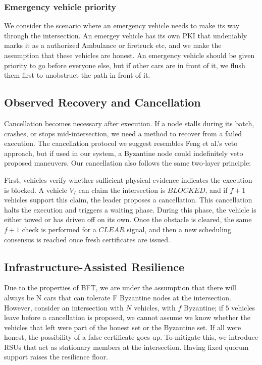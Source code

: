\documentclass[letterpaper,10pt,conference]{IEEEtran}
\begin{document}
\subsubsection{Emergency vehicle priority}

We consider the scenario where an emergency vehicle needs to make its way through the intersection. An emergey vehicle has its own PKI that undeniably marks it as a authorized Ambulance or firetruck etc, and we make the assumption that these vehicles are honest. An emergency vehicle should be given priority to go before everyone else, but if other cars are in front of it, we flush them first to unobstruct the path in front of it.


\subsection{Observed Recovery and Cancellation}
\label{sec:recovery}

Cancellation becomes necessary after execution. If a node stalls during its batch, crashes, or stops mid-intersection, we need a method to recover from a failed execution. The cancellation protocol we suggest resembles Feng et al.'s veto approach, but if used in our system, a Byzantine node could indefinitely veto proposed maneuvers. Our cancellation also follows the same two-layer principle:

First, vehicles verify whether sufficient physical evidence indicates the execution is blocked. A vehicle $V_I$ can claim the intersection is $BLOCKED$, and if $f+1$ vehicles support this claim, the leader proposes a cancellation. This cancellation halts the execution and triggers a waiting phase. During this phase, the vehicle is either towed or has driven off on its own. Once the obstacle is cleared, the same $f+1$ check is performed for a $CLEAR$ signal, and then a new scheduling consensus is reached once fresh certificates are issued. 


\subsection{Infrastructure-Assisted Resilience}
\label{sec:rsu}


Due to the properties of BFT, we are under the assumption that there will always be N cars that can tolerate F Byzantine nodes at the intersection. However, consider an intersection with $N$ vehicles, with $f$ Byzantine; if $5$ vehicles leave before a cancellation is proposed, we cannot assume we know whether the vehicles that left were part of the honest set or the Byzantine set. If all were honest, the possibility of a false certificate goes up. To mitigate this, we introduce RSUs that act as stationary members at the intersection. Having fixed quorum support raises the resilience floor. 
\end{document}
